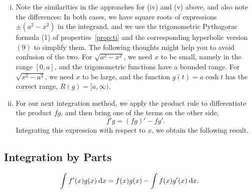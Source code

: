 \begin{remark}
\begin{enumerate}[(i)]
	\item Note the similarities in the approaches for (iv) and (v) above, and also note the differences: In both cases, we have square roots of expressions $\pm(a^2-x^2)$ in the integrand, and we use the trigonometric Pythagoras formula (1) of properties~\ref{prop:ti} and the corresponding hyperbolic version $(9)$ to simplify them. The following thoughts might help you to avoid confusion of the two. For $\sqrt{a^2-x^2}$, we need $x$ to be small, namely in the range $[0,a]$, and the trigonometric functions have a bounded range. For $\sqrt{x^2-a^2}$, we need $x$ to be large, and the function $g(t) = a\cosh t$ has the correct range, $ R(g) = [a,\infty)$.
	\item For our next integration method, we apply the product rule to differentiate the product $fg$, and then bring one of the terms on the other side,
	\[ f'g = (fg)' - fg'.\]
	Integrating this expression with respect to $x$, we obtain the following result.
\end{enumerate}
\end{remark}

\subsection{Integration by Parts}

\begin{theorem}
\[ \int_{}^{} f'(x)g(x) \: \mathrm{d} x = f(x)g(x) - \int_{}^{} f(x)g'(x) \: \mathrm{d} x. \]
\end{theorem}


